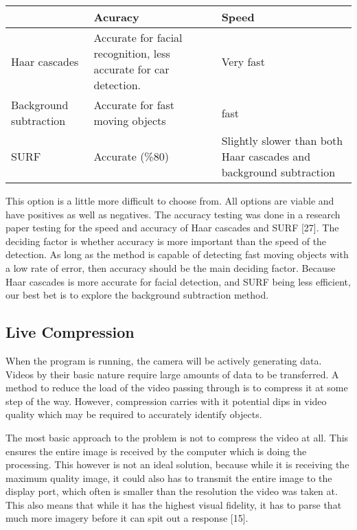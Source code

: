 \documentclass[letterpaper,10pt,onecolumn,draftclsnofoot]{IEEEtran}
\begin{document}
\begin{center}
	\begin{tabular}{|p{4cm}|p{5cm}|p{4cm}|}
		
		\hline
		\textbf{} & \textbf{Acuracy} & \textbf{Speed} \\
		\hline
		Haar cascades & Accurate for facial recognition, less accurate for car detection. & Very fast \\
		\hline
		Background subtraction & Accurate for fast moving objects & fast \\
		\hline
		SURF & Accurate (\%80)  & Slightly slower than both Haar cascades and background subtraction \\
		\hline
		
	\end{tabular}
\end{center}

This option is a little more difficult to choose from.
All options are viable and have positives as well as negatives.
The accuracy testing was done in a research paper testing for the speed and accuracy of Haar cascades and SURF [27].
The deciding factor is whether accuracy is more important than the speed of the detection.
As long as the method is capable of detecting fast moving objects with a low rate of error, then accuracy should be the main deciding factor.
Because Haar cascades is more accurate for facial detection, and SURF being less efficient, our best bet is to explore the background subtraction method.

\newpage
\subsection{Live Compression} %

When the program is running, the camera will be actively generating data.  Videos by their basic nature require large amounts of data to be transferred.  A method to reduce the load of the video passing through is to compress it at some step of the way.  However, compression carries with it potential dips in video quality which may be required to accurately identify objects.

The most basic approach to the problem is not to compress the video at all.  This ensures the entire image is received by the computer which is doing the processing.  This however is not an ideal solution, because while it is receiving the maximum quality image, it could also has to transmit the entire image to the display port, which often is smaller than the resolution the video was taken at.  This also means that while it has the highest visual fidelity, it has to parse that much more imagery before it can spit out a response [15].
\end{document}
